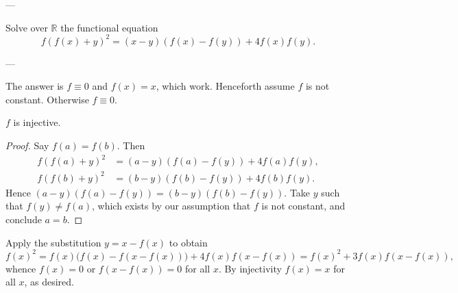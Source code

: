 
---

Solve over $\mathbb R$ the functional equation \[f(f(x)+y)^2=(x-y)(f(x)-f(y))+4f(x)f(y).\]

---

The answer is $f\equiv0$ and $f(x)=x$, which work. Henceforth assume $f$ is not constant. Otherwise $f\equiv0$.
\begin{iclaim*}
    $f$ is injective.
\end{iclaim*}
\begin{proof}
    Say $f(a)=f(b)$. Then 
    \begin{align*}
        f(f(a)+y)^2&=(a-y)(f(a)-f(y))+4f(a)f(y),\\
        f(f(b)+y)^2&=(b-y)(f(b)-f(y))+4f(b)f(y).
    \end{align*}
    Hence $(a-y)(f(a)-f(y))=(b-y)(f(b)-f(y))$. Take $y$ such that $f(y)\ne f(a)$, which exists by our assumption that $f$ is not constant, and conclude $a=b$.
\end{proof}

Apply the substitution $y=x-f(x)$ to obtain \[f(x)^2=f(x)\big(f(x)-f(x-f(x))\big)+4f(x)f(x-f(x))=f(x)^2+3f(x)f(x-f(x)),\]
whence $f(x)=0$ or $f(x-f(x))=0$ for all $x$. By injectivity $f(x)=x$ for all $x$, as desired.
